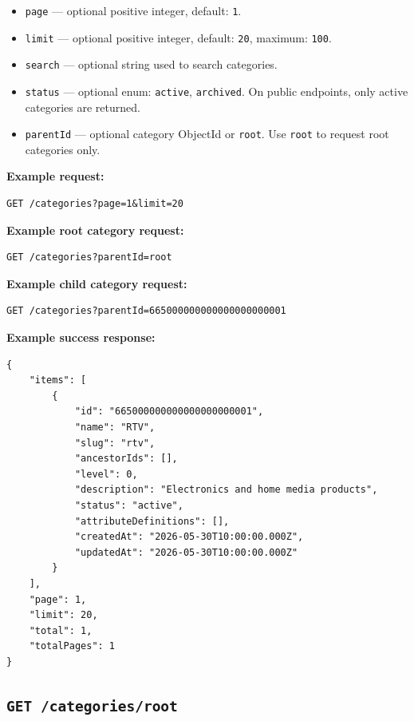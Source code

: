 \begin{itemize}
    \item \texttt{page} --- optional positive integer, default: \texttt{1}.
    \item \texttt{limit} --- optional positive integer, default: \texttt{20}, maximum: \texttt{100}.
    \item \texttt{search} --- optional string used to search categories.
    \item \texttt{status} --- optional enum: \texttt{active}, \texttt{archived}. On public endpoints, only active categories are returned.
    \item \texttt{parentId} --- optional category ObjectId or \texttt{root}. Use \texttt{root} to request root categories only.
\end{itemize}

\textbf{Example request:}

\begin{verbatim}
GET /categories?page=1&limit=20
\end{verbatim}

\textbf{Example root category request:}

\begin{verbatim}
GET /categories?parentId=root
\end{verbatim}

\textbf{Example child category request:}

\begin{verbatim}
GET /categories?parentId=665000000000000000000001
\end{verbatim}

\textbf{Example success response:}

\begin{verbatim}
{
    "items": [
        {
            "id": "665000000000000000000001",
            "name": "RTV",
            "slug": "rtv",
            "ancestorIds": [],
            "level": 0,
            "description": "Electronics and home media products",
            "status": "active",
            "attributeDefinitions": [],
            "createdAt": "2026-05-30T10:00:00.000Z",
            "updatedAt": "2026-05-30T10:00:00.000Z"
        }
    ],
    "page": 1,
    "limit": 20,
    "total": 1,
    "totalPages": 1
}
\end{verbatim}

\subsection{\texttt{GET /categories/root}}

